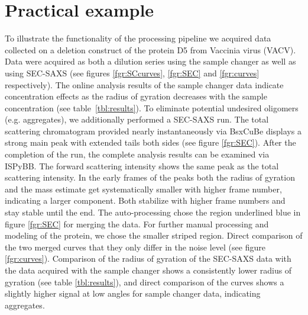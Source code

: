 \documentclass[preprint,pdf]{iucr}              %
\begin{document}
\section{Practical example}
To illustrate the functionality of the processing pipeline we acquired data collected
on a deletion construct of the protein D5 from  Vaccinia virus (VACV).
Data were acquired as both a dilution series using the sample changer as well as
using SEC-SAXS (see figures \ref{fgr:SCcurves}, \ref{fgr:SEC} and \ref{fgr:curves} respectively).
The online analysis results of the sample changer data indicate concentration effects
as the radius of gyration decreases with the  sample concentration (see table~\ref{tbl:results}).
To eliminate potential undesired oligomers (e.g. aggregates), we additionally performed a SEC-SAXS run.
The total scattering chromatogram provided nearly instantaneously via BsxCuBe displays a strong main
peak with extended tails both sides (see figure \ref{fgr:SEC}).
After the completion of the run, the complete analysis results can be examined via
ISPyBB.
The forward scattering intensity shows the same peak as the total scattering intensity.
In the early frames of the peaks both the radius of gyration and the mass estimate get systematically
smaller with higher frame number, indicating a larger component.
Both stabilize with higher frame numbers and stay stable until the end.
The auto-processing chose the region underlined blue in figure  \ref{fgr:SEC}
for merging the data.
For further manual processing and modeling of the protein, we chose the smaller
striped region.
Direct comparison of the two merged curves that they only differ in the noise level
(see figure \ref{fgr:curves}).
Comparison of the radius of gyration of the SEC-SAXS data with the data acquired with the sample
changer shows a consistently lower radius of gyration (see table \ref{tbl:results}), and direct
comparison of the curves shows a slightly higher signal at low angles for sample changer data,
indicating aggregates.

\end{document}
